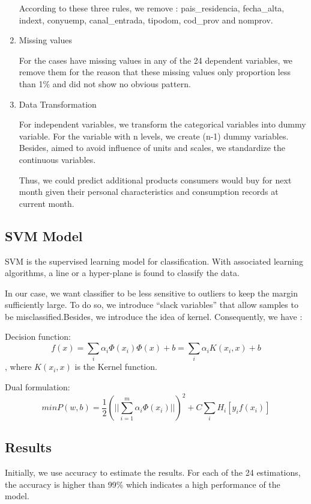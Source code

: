 \documentclass{article}
\begin{document}
\begin{spacing}{1}
\begin{large}
\begin{enumerate}
	According to these three  rules, we remove : pais\_residencia, fecha\_alta, indext, conyuemp, canal\_entrada, tipodom, cod\_prov and nomprov.

	\item  Missing values

	For the cases have missing values in any of the 24 dependent variables, we remove them for the reason that these missing values only proportion less than 1\% and did not show no obvious pattern. 

	\item Data Transformation

	For independent variables, we transform the categorical variables into dummy variable. For the variable with n levels, we create (n-1) dummy variables. Besides, aimed to avoid influence of units and scales, we standardize the continuous variables. 

	Thus, we could predict additional products consumers would buy for next month given their personal characteristics and consumption records at current month.
\end{enumerate}

\subsection{SVM Model}

SVM is the supervised learning model for classification. With associated learning algorithms, a line or a hyper-plane is found to classify the data.

In our case, we want classifier to be less sensitive to outliers to keep the margin sufficiently large. To do so, we introduce “slack variables” that allow samples to be misclassified.Besides, we introduce the idea of kernel. Consequently, we have :

Decision function:
$$f(x) = \displaystyle\sum_{i}\alpha_i\Phi(x_i)\Phi(x)+b = \displaystyle\sum_{i}\alpha_{i} K(x_i, x)+b$$, where $K(x_i, x)$ is the Kernel function.

Dual formulation:
$$min P(w,b) = \frac{1}{2}(||\displaystyle\sum_{i=1}^{m}\alpha_i\Phi(x_i)||)^2 + C\displaystyle\sum_{i}H_{i}[y_{i}f(x_i)]$$

\subsection{Results}

Initially, we use accuracy to estimate the results. For each of the 24 estimations, the accuracy is higher than 99\% which indicates a high performance of the model.


\end{large}
\end{spacing}
\end{document}
